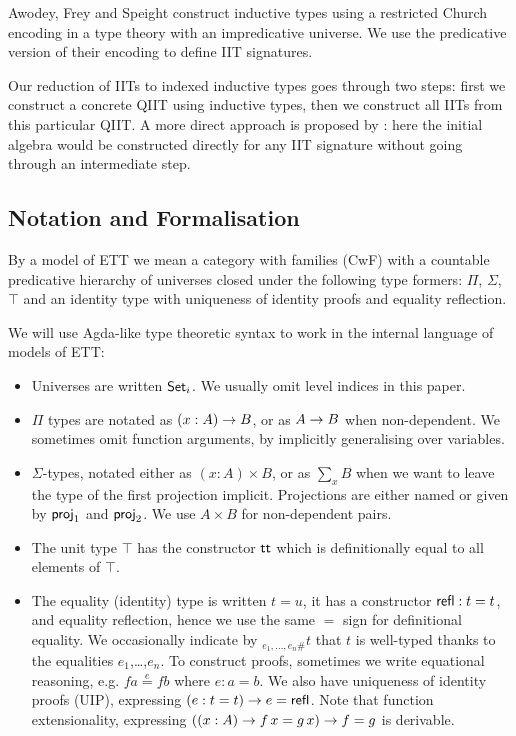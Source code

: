 \documentclass[a4paper,UKenglish,cleveref, autoref]{lipics-v2019}
\begin{document}
Awodey, Frey and Speight \cite{DBLP:conf/lics/AwodeyFS18} construct
inductive types using a restricted Church encoding in a type theory
with an impredicative universe. We use the predicative version of
their encoding to define IIT signatures.

Our reduction of IITs to indexed inductive types goes through two
steps: first we construct a concrete QIIT using inductive types, then
we construct all IITs from this particular QIIT. A more direct
approach is proposed by \cite{erasure}: here the initial algebra would
be constructed directly for any IIT signature without going through an
intermediate step.

\subsection{Notation and Formalisation}
\label{sec:notation}

\begin{definition}\label{def:ett}
  By a model of ETT we mean a category with families (CwF)
  \cite{Dybjer96internaltype,Hofmann97syntaxand} with a countable
  predicative hierarchy of universes closed under the following type
  formers: $\Pi$, $\Sigma$, $\top$ and an identity type with
  uniqueness of identity proofs and equality reflection.
\end{definition}

We will use Agda-like type theoretic syntax to work in the internal
language of models of ETT:
\begin{itemize}
\item Universes are written $\Set_i$. We usually omit level indices in this paper.
\item $\Pi$ types are notated as $(x : A)\ra B$, or as $A \ra B$ when
  non-dependent. We sometimes omit function arguments, by implicitly
  generalising over variables.
\item $\Sigma$-types, notated either as $(x : A)\times B$, or as
  $\sum\limits_{x} B$ when we want to leave the type of the first
  projection implicit. Projections are either named or given by
  $\proj_1$ and $\proj_2$. We use $A \times B$ for non-dependent
  pairs.
\item The unit type $\top$ has the constructor $\tt$ which is
  definitionally equal to all elements of $\top$.
\item The equality (identity) type is written $t = u$, it has a
  constructor $\refl : t = t$, and equality reflection, hence we use
  the same $=$ sign for definitional equality. We occasionally
  indicate by $_{e_1,\dots,e_n \#}t$ that $t$ is well-typed thanks to
  the equalities $e_1$,\dots,$e_n$. To construct proofs, sometimes we
  write equational reasoning, e.g. $f a \overset{e}{=} f b$ where
  $e : a = b$. We also have uniqueness of identity proofs (UIP),
  expressing $(e : t = t)\ra e = \refl$. Note that function
  extensionality, expressing $((x : A) \ra f\,x = g\,x) \ra f = g$ is
  derivable.
\end{itemize}
\end{document}
